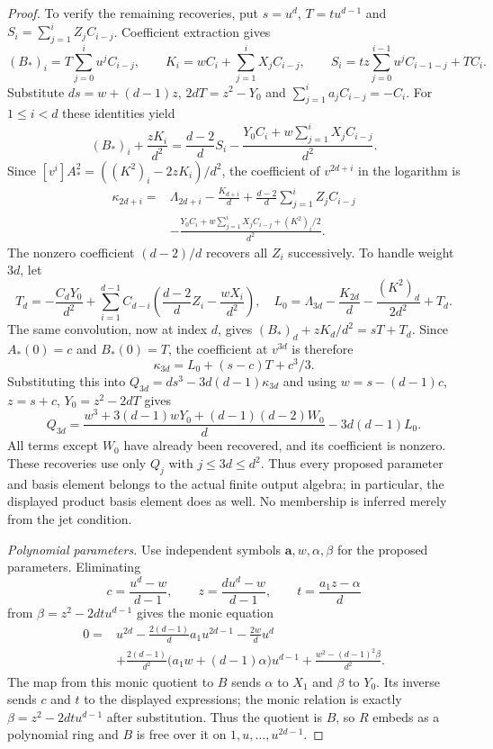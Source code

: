 \documentclass[10pt,fleqn]{article}
\numberwithin{equation}{section}
\begin{document}
\begin{proof}
To verify the remaining recoveries, put $s=u^d$, $T=tu^{d-1}$ and
$S_i=\sum_{j=1}^iZ_jC_{i-j}$.  Coefficient extraction gives
\[
 (B_*)_i=T\sum_{j=0}^iu^jC_{i-j},\qquad
 K_i=wC_i+\sum_{j=1}^iX_jC_{i-j},\qquad
 S_i=tz\sum_{j=0}^{i-1}u^jC_{i-1-j}+TC_i.
\]
Substitute $ds=w+(d-1)z$, $2dT=z^2-Y_0$ and
$\sum_{j=1}^ia_jC_{i-j}=-C_i$.  For $1\le i<d$ these identities yield
\[
 (B_*)_i+\frac{zK_i}{d^2}
 =\frac{d-2}{d}S_i-\frac{Y_0C_i+w\sum_{j=1}^iX_jC_{i-j}}{d^2}.
\]
Since $[v^i]A_*^2=((K^2)_i-2zK_i)/d^2$, the coefficient of
$v^{2d+i}$ in the logarithm is
\[
 \begin{split}
 \kappa_{2d+i}={}&\Lambda_{2d+i}-\frac{K_{d+i}}d
   +\frac{d-2}{d}\sum_{j=1}^i Z_jC_{i-j}\\
 &-\frac{Y_0C_i+w\sum_{j=1}^iX_jC_{i-j}+(K^2)_i/2}{d^2}.
 \end{split}
\]
The nonzero coefficient $(d-2)/d$ recovers all $Z_i$ successively.
To handle weight $3d$, let
\[
 T_d=-\frac{C_dY_0}{d^2}+\sum_{i=1}^{d-1}C_{d-i}
             \left(\frac{d-2}{d}Z_i-\frac{wX_i}{d^2}\right),\quad
 L_0=\Lambda_{3d}-\frac{K_{2d}}d-\frac{(K^2)_d}{2d^2}+T_d.
\]
The same convolution, now at index $d$, gives
$(B_*)_d+zK_d/d^2=sT+T_d$.  Since $A_*(0)=c$ and $B_*(0)=T$,
the coefficient at $v^{3d}$ is therefore
\[
 \kappa_{3d}=L_0+(s-c)T+c^3/3.
\]
Substituting this into $Q_{3d}=ds^3-3d(d-1)\kappa_{3d}$ and using
$w=s-(d-1)c$, $z=s+c$, $Y_0=z^2-2dT$ gives
\[
 Q_{3d}=\frac{w^3+3(d-1)wY_0+(d-1)(d-2)W_0}{d}
                    -3d(d-1)L_0.
\]
All terms except $W_0$ have already been recovered, and its coefficient
is nonzero.  These recoveries use only $Q_j$ with $j\le3d\le d^2$.
Thus every proposed parameter and basis element belongs to the actual
finite output algebra; in particular, the displayed product basis element
does as well.  No membership is inferred merely from the jet condition.

\textit{Polynomial parameters.}
Use independent symbols $\mathbf a,w,\alpha,\beta$ for the proposed
parameters.  Eliminating
\[
 c=\frac{u^d-w}{d-1},\qquad
 z=\frac{du^d-w}{d-1},\qquad t=\frac{a_1z-\alpha}{d}
\]
from $\beta=z^2-2dtu^{d-1}$ gives the monic equation
\[
 \begin{split}
 0={}&u^{2d}-\frac{2(d-1)}d a_1u^{2d-1}-\frac{2w}d u^d\\
 &+\frac{2(d-1)}{d^2}\bigl(a_1w+(d-1)\alpha\bigr)u^{d-1}
       +\frac{w^2-(d-1)^2\beta}{d^2}.
 \end{split}
\]
The map from this monic quotient to $B$ sends
$\alpha$ to $X_1$ and $\beta$ to $Y_0$.
Its inverse sends $c$ and $t$ to the displayed expressions; the monic
relation is exactly $\beta=z^2-2dtu^{d-1}$ after substitution.
Thus the quotient is $B$, so $R$ embeds as a polynomial ring and $B$
is free over it on $1,u,\ldots,u^{2d-1}$.


\end{proof}
\end{document}
